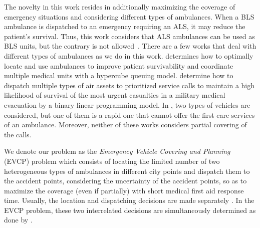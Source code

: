

The novelty in this work resides in additionally maximizing the coverage of emergency situations and considering different types of ambulances. When a BLS ambulance is dispatched to an emergency requiring an ALS, it may reduce the patient's survival. Thus, this work considers that ALS ambulances can be used as BLS units, but the contrary is not allowed~\citep{bakalos2011advanced}. There are a few works that deal with different types of ambulances as we do in this work. \citet{mclay2009maximum} determines how to optimally locate and use ambulances to improve patient survivability and coordinate multiple medical units with a hypercube queuing model. \citet{grannan2015maximum} determine how to dispatch multiple types of air assets to prioritized service calls to maintain a high likelihood of survival of the most urgent casualties in a military medical evacuation by a binary linear programming model. In \citet{yoon2021stochastic}, two types of vehicles are considered, but one of them is a rapid one that cannot offer the first care services of an ambulance. Moreover, neither of these works considers partial covering of the calls. 

We denote our problem as the \textit{Emergency Vehicle Covering and Planning} (EVCP) problem which consists of locating the limited number of two heterogeneous types of ambulances in different city points and dispatch them to the accident points, considering the uncertainty of the accident points, so as to maximize the coverage (even if partially) with short medical first aid response time. Usually, the location and dispatching decisions are made separately \citep{belanger2019recent, dibene2017optimizing, wang2012modeling}. In the EVCP problem, these two interrelated decisions are simultaneously determined as done by \citet{toro2015reducing, ansari2017maximum, amorim2019traffic}. 

